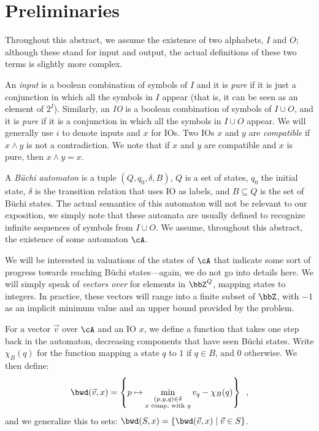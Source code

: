 \documentclass[sigconf,screen,nonacm]{acmart}
\begin{document}
\section{Preliminaries}

Throughout this abstract, we assume the existence of two alphabets, \(I\) and
\(O\); although these stand for input and output, the actual definitions of these
two terms is slightly more complex.

An \emph{input} is a boolean combination of symbols of \(I\) and it is \emph{pure}
if it is just a conjunction in which all the symbols in \(I\) appear (that is, it
can be seen as an element of \(2^I\)).  Similarly, an \emph{IO} is a boolean
combination of symbols of \(I \cup O\), and it is \emph{pure} if it is a conjunction
in which all the symbols in \(I \cup O\) appear.  We will generally use \(i\) to denote
inputs and \(x\) for IOs.  Two IOs \(x\) and \(y\) are \emph{compatible} if
\(x \land y\) is not a contradiction.  We note that if \(x\) and \(y\) are compatible
and \(x\) is pure, then \(x \land y = x\).

A \emph{Büchi automaton} \cA is a tuple \((Q, q_0, \delta, B)\), \(Q\) is a set of
states, \(q_0\) the initial state, \(\delta\) is the transition relation that uses IO as
labels, and \(B \subseteq Q\) is the set of Büchi states.  The actual semantics of this
automaton will not be relevant to our exposition, we simply note that these
automata are usually defined to recognize infinite sequences of symbols from
\(I \cup O\).  We assume, throughout this abstract, the existence of some automaton
\(\cA\).

We will be interested in valuations of the states of \(\cA\) that indicate some
sort of progress towards reaching Büchi states---again, we do not go into details
here.  We will simply speak of \emph{vectors over \cA} for elements in
\(\bbZ^Q\), mapping states to integers.  In practice, these vectors will range
into a finite subset of \(\bbZ\), with \(-1\) as an implicit minimum value and an
upper bound provided by the problem.

For a vector \(\vec{v}\) over \(\cA\) and an IO \(x\), we define a function that takes
one step back in the automaton, decreasing components that have seen Büchi
states.  Write \(\chi_B(q)\) for the function mapping a state \(q\) to \(1\) if \(q \in B\),
and \(0\) otherwise.  We then define:
\[\bwd(\vec{v}, x) = \left\{p \mapsto \min_{\substack{(p, y, q) \in \delta\\ x \text{ comp.\ with } y}} v_q -
  \chi_B(q)\right\}\enspace,\]
and we generalize this to sets: \(\bwd(S, x) = \{\bwd(\vec{v}, x) \mid \vec{v}
\in S\}\).
\end{document}
